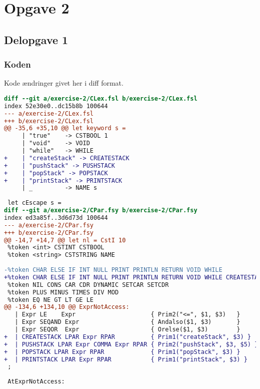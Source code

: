 \section{Opgave 2}
\subsection{Delopgave 1}\label{ass:2-1}
\subsubsection{Koden}
Kode ændringer givet her i diff format.
\begin{lstlisting}[language=diff]
diff --git a/exercise-2/CLex.fsl b/exercise-2/CLex.fsl
index 52e30e0..dc15b8b 100644
--- a/exercise-2/CLex.fsl
+++ b/exercise-2/CLex.fsl
@@ -35,6 +35,10 @@ let keyword s =
     | "true"    -> CSTBOOL 1
     | "void"    -> VOID 
     | "while"   -> WHILE         
+    | "createStack" -> CREATESTACK
+    | "pushStack" -> PUSHSTACK
+    | "popStack" -> POPSTACK
+    | "printStack" -> PRINTSTACK
     | _         -> NAME s
  
 let cEscape s = 
diff --git a/exercise-2/CPar.fsy b/exercise-2/CPar.fsy
index ed3a85f..3d6d73d 100644
--- a/exercise-2/CPar.fsy
+++ b/exercise-2/CPar.fsy
@@ -14,7 +14,7 @@ let nl = CstI 10
 %token <int> CSTINT CSTBOOL
 %token <string> CSTSTRING NAME
 
-%token CHAR ELSE IF INT NULL PRINT PRINTLN RETURN VOID WHILE
+%token CHAR ELSE IF INT NULL PRINT PRINTLN RETURN VOID WHILE CREATESTACK PUSHSTACK POPSTACK PRINTSTACK
 %token NIL CONS CAR CDR DYNAMIC SETCAR SETCDR
 %token PLUS MINUS TIMES DIV MOD
 %token EQ NE GT LT GE LE
@@ -134,6 +134,10 @@ ExprNotAccess:
   | Expr LE    Expr                     { Prim2("<=", $1, $3)   }
   | Expr SEQAND Expr                    { Andalso($1, $3)       }
   | Expr SEQOR  Expr                    { Orelse($1, $3)        }
+  | CREATESTACK LPAR Expr RPAR          { Prim1("createStack", $3) }
+  | PUSHSTACK LPAR Expr COMMA Expr RPAR { Prim2("pushStack", $3, $5) }
+  | POPSTACK LPAR Expr RPAR             { Prim1("popStack", $3) }
+  | PRINTSTACK LPAR Expr RPAR           { Prim1("printStack", $3) }
 ;
 
 AtExprNotAccess:
\end{lstlisting}

